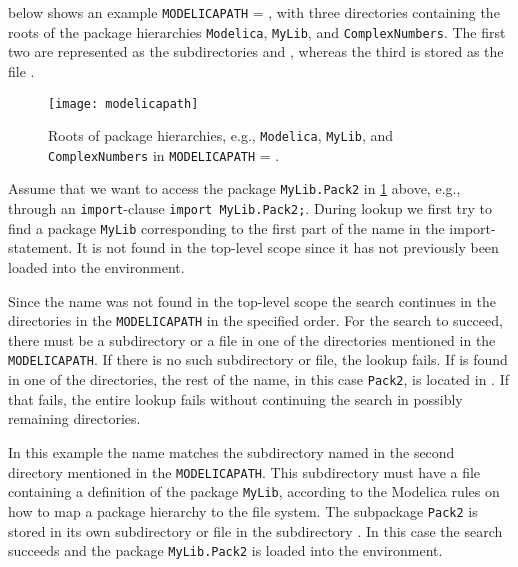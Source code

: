 \begin{example}
 below shows an example \lstinline!MODELICAPATH! = , with three directories containing the roots of the package hierarchies \lstinline!Modelica!, \lstinline!MyLib!, and \lstinline!ComplexNumbers!.
The first two are represented as the subdirectories  and , whereas the third is stored as the file .

\begin{figure}[H]
  \begin{center}
    \texttt{[image: modelicapath]}
  \end{center}
  \caption{Roots of package hierarchies, e.g., \lstinline!Modelica!, \lstinline!MyLib!, and \lstinline!ComplexNumbers! in
  \lstinline!MODELICAPATH! = .}
  \label{fig:roots}
\end{figure}

Assume that we want to access the package \lstinline!MyLib.Pack2! in \cref{fig:roots} above, e.g., through an \lstinline!import!-clause \lstinline!import MyLib.Pack2;!.
During lookup we first try to find a package \lstinline!MyLib! corresponding to the first part of the name in the import-statement.
It is not found in the top-level scope since it has not previously been loaded into the environment.

Since the name was not found in the top-level scope the search continues in the directories in the \lstinline!MODELICAPATH! in the specified order.
For the search to succeed, there must be a subdirectory  or a file  in one of the directories mentioned in the \lstinline!MODELICAPATH!.
If there is no such subdirectory or file, the lookup fails.
If  is found in one of the directories, the rest of the name, in this case \lstinline!Pack2!, is located in .
If that fails, the entire lookup fails without continuing the search in possibly remaining directories.

In this example the name matches the subdirectory named  in the second directory  mentioned in the \lstinline!MODELICAPATH!.
This subdirectory must have a file  containing a definition of the package \lstinline!MyLib!, according to the Modelica rules on how to map a package hierarchy to the file system.
The subpackage \lstinline!Pack2! is stored in its own subdirectory or file in the subdirectory .
In this case the search succeeds and the package \lstinline!MyLib.Pack2! is loaded into the environment.
\end{example}


